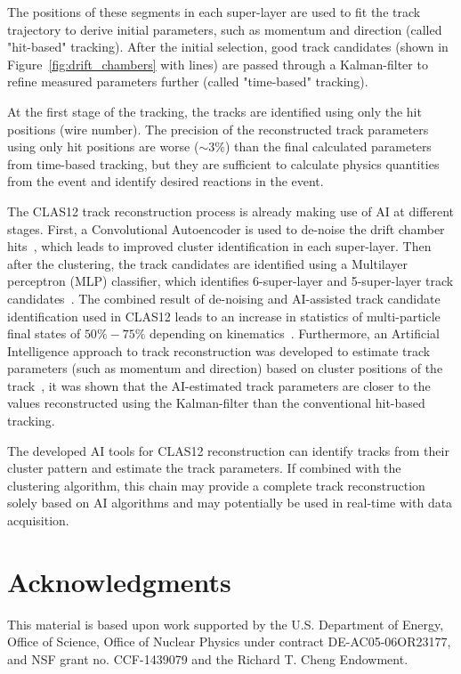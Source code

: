 \documentclass[preprint,12pt]{elsarticle}
\begin{document}
The positions of these segments in each super-layer are used to fit the track trajectory 
to derive initial parameters, such as momentum and direction (called "hit-based" tracking).  After the initial selection, good track candidates 
(shown in Figure~\ref{fig:drift_chambers} with lines) are passed through a Kalman-filter to 
refine measured parameters further (called "time-based" tracking).

At the first stage of the tracking, the tracks are identified using only the hit positions (wire number). The precision 
of the reconstructed track parameters using only hit positions are worse ($\sim3\%$) than the final calculated parameters from time-based tracking, but they are sufficient to calculate physics quantities from the event and identify desired reactions in the event. 

The CLAS12 track reconstruction process is already making use of AI at different stages.
First, a Convolutional
Autoencoder is used to de-noise the drift chamber hits~\cite{Thomadakis:2022zcd}, which leads to improved cluster
identification in each super-layer. Then after the clustering, the track candidates are identified using a Multilayer perceptron (MLP) classifier,
which identifies 6-super-layer and 5-super-layer track candidates~\cite{Gavalian:2020oxg}. The combined result of
de-noising and AI-assisted track candidate identification used in CLAS12 leads to an increase in statistics of multi-particle 
final states of $50\%-75\%$ depending on kinematics~\cite{Gavalian:2020xmc}. 
Furthermore, an Artificial Intelligence approach to track reconstruction was developed to estimate track parameters 
(such as momentum and direction) based on cluster positions of the track~\cite{Thomadakis:2023ebe}, it was shown that 
the AI-estimated track parameters are closer to the values reconstructed using the Kalman-filter than the 
conventional hit-based tracking.

The developed AI tools for CLAS12 reconstruction can identify tracks from their cluster pattern and estimate the track parameters.
If combined with the clustering algorithm, this chain may provide a complete track reconstruction solely based on AI algorithms and
may potentially be used in real-time with data acquisition. 

%
%


\section{Acknowledgments}
This material is based upon work supported by the U.S. Department of Energy, Office of Science, Office of Nuclear Physics under contract DE-AC05-06OR23177, and NSF grant no. CCF-1439079 and the Richard T. Cheng Endowment. 
 
%
%
\end{document}
